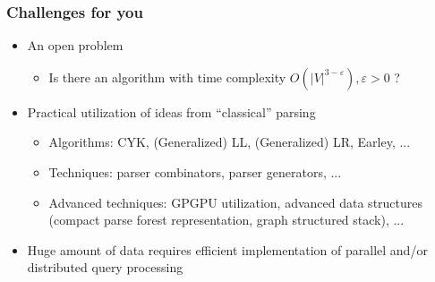 \documentclass[xcolor=table,aspectratio=169]{beamer}
\begin{document}
\begin{frame}[fragile]
  \transwipe[direction=90]
  \frametitle{Challenges for you}
  \begin{itemize}
  \item An open problem
    \begin{itemize}
        \item Is there an algorithm with time complexity $O(|V|^{3-\varepsilon}), 
        \varepsilon > 0$ ?
    \end{itemize}
  \item Practical utilization of ideas from ``classical'' parsing
    \begin{itemize}
        \item Algorithms: CYK, (Generalized) LL, (Generalized) LR, Earley, ...
        \item Techniques: parser combinators, parser generators, ... 
        \item Advanced techniques: GPGPU utilization, advanced data structures (compact parse forest representation, graph structured stack), ...
    \end{itemize}
  \item Huge amount of data requires efficient implementation of parallel and/or distributed query processing
  \end{itemize}

\end{frame}
\end{document}
